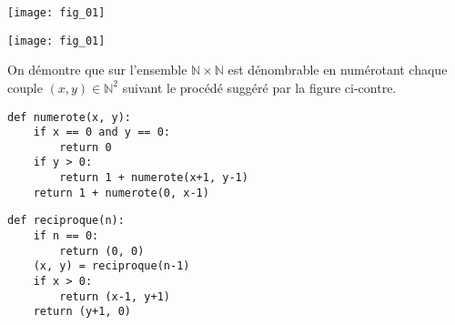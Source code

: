 \setcounter{question}{0}
\ifprof
\begin{center}
\texttt{[image: fig\_01]}
\end{center}
\else
\begin{marginfigure}
\begin{center}
\texttt{[image: fig\_01]}
\end{center}
\end{marginfigure}
\fi
On démontre que sur l'ensemble $\mathbb{N}\times \mathbb{N}$ est dénombrable en numérotant chaque couple $(x,y)\in\mathbb{N}^2$ suivant le procédé suggéré par la figure ci-contre.


\ifprof
\begin{corrige}
\begin{lstlisting}
def numerote(x, y):
    if x == 0 and y == 0:
        return 0
    if y > 0:
        return 1 + numerote(x+1, y-1)
    return 1 + numerote(0, x-1)
\end{lstlisting}
\end{corrige}
\else
\fi

\ifprof
\begin{corrige}
\begin{lstlisting}
def reciproque(n):
    if n == 0:
        return (0, 0)
    (x, y) = reciproque(n-1)
    if x > 0:
        return (x-1, y+1)
    return (y+1, 0)
\end{lstlisting}
\end{corrige}
\else
\fi



%
%
%
%
%
%
%

